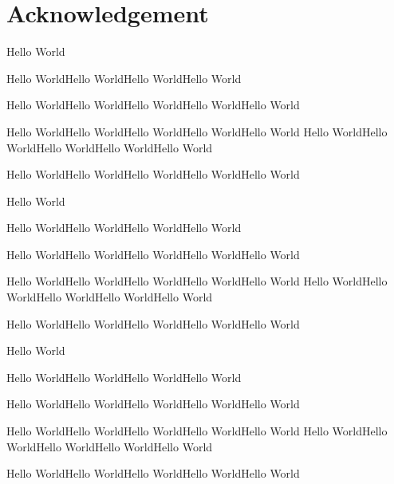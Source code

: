 \section*{Acknowledgement}
Hello World

Hello WorldHello WorldHello WorldHello World

Hello WorldHello WorldHello WorldHello WorldHello World

Hello WorldHello WorldHello WorldHello WorldHello World
Hello WorldHello WorldHello WorldHello WorldHello World

Hello WorldHello WorldHello WorldHello WorldHello World

Hello World

Hello WorldHello WorldHello WorldHello World

Hello WorldHello WorldHello WorldHello WorldHello World

Hello WorldHello WorldHello WorldHello WorldHello World
Hello WorldHello WorldHello WorldHello WorldHello World

Hello WorldHello WorldHello WorldHello WorldHello World


Hello World

Hello WorldHello WorldHello WorldHello World

Hello WorldHello WorldHello WorldHello WorldHello World

Hello WorldHello WorldHello WorldHello WorldHello World
Hello WorldHello WorldHello WorldHello WorldHello World

Hello WorldHello WorldHello WorldHello WorldHello World

